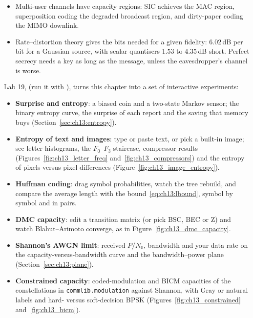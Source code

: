\begin{itemize}
little capacity when codes span many fades (ergodic capacity) but a great deal when they do not
(outage), which diversity repairs. MIMO multiplies the high-SNR slope by $\min(n_t,n_r)$.
\item Multi-user channels have capacity regions: SIC achieves the MAC region, superposition coding
the degraded broadcast region, and dirty-paper coding the MIMO downlink.
\item Rate--distortion theory gives the bits needed for a given fidelity: 6.02\,dB per bit for a
Gaussian source, with scalar quantisers 1.53 to 4.35\,dB short. Perfect secrecy needs a key as long
as the message, unless the eavesdropper's channel is worse.
\end{itemize}

\begin{labbox}
Lab 19,  (run it with
), turns this chapter into a set of interactive
experiments:
\begin{itemize}
\item \textbf{Surprise and entropy}: a biased coin and a two-state Markov sensor; the binary entropy
curve, the surprise of each report and the saving that memory buys (Section~\ref{sec:ch13:entropy}).
\item \textbf{Entropy of text and images}: type or paste text, or pick a built-in image; see letter histograms,
the $F_0$--$F_3$ staircase, compressor results (Figures~\ref{fig:ch13_letter_freq}
and~\ref{fig:ch13_compressors}) and the entropy of pixels versus pixel differences
(Figure~\ref{fig:ch13_image_entropy}).
\item \textbf{Huffman coding}: drag symbol probabilities, watch the tree rebuild, and compare the
average length with the bound~\eqref{eq:ch13:lbound}, symbol by symbol and in pairs.
\item \textbf{DMC capacity}: edit a transition matrix (or pick BSC, BEC or Z) and watch
Blahut--Arimoto converge, as in Figure~\ref{fig:ch13_dmc_capacity}.
\item \textbf{Shannon's AWGN limit}: received $P/N_0$, bandwidth and your data rate on the
capacity-versus-bandwidth curve and the bandwidth--power plane (Section~\ref{sec:ch13:plane}).
\item \textbf{Constrained capacity}: coded-modulation and BICM capacities of the constellations in
\texttt{commlib.modulation} against Shannon, with Gray or natural labels and hard- versus
soft-decision BPSK (Figures~\ref{fig:ch13_constrained} and~\ref{fig:ch13_bicm}).

\end{itemize}
\end{labbox}
